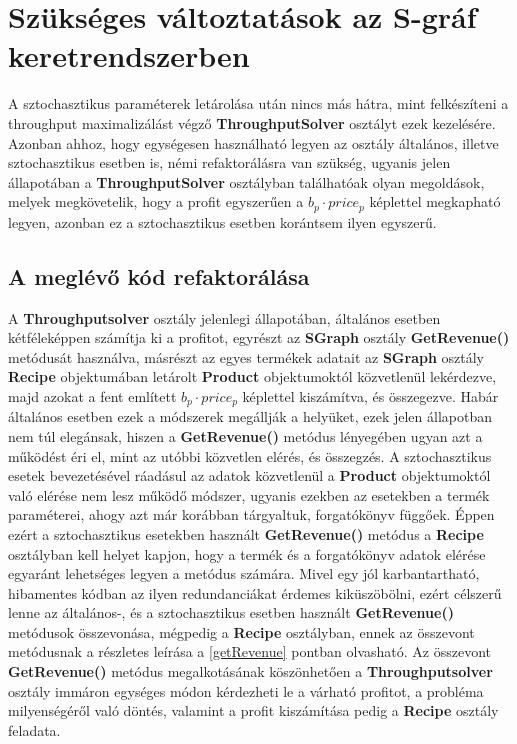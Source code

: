 \section{Szükséges változtatások az S-gráf keretrendszerben} \label{refactor}
A sztochasztikus paraméterek letárolása után nincs más hátra, mint felkészíteni a throughput maximalizálást végző \textbf{ThroughputSolver} osztályt ezek kezelésére. Azonban ahhoz, hogy egységesen használható legyen az osztály általános, illetve sztochasztikus esetben is, némi refaktorálásra van szükség, ugyanis jelen állapotában a \textbf{ThroughputSolver} osztályban találhatóak olyan megoldások, melyek megkövetelik, hogy a profit egyszerűen a $b_p\cdot price_p$ képlettel megkapható legyen, azonban ez a sztochasztikus esetben korántsem ilyen egyszerű.
\subsection{A meglévő kód refaktorálása}
A \textbf{Throughputsolver} osztály jelenlegi állapotában, általános esetben kétféleképpen számítja ki a profitot, egyrészt az \textbf{SGraph} osztály \textbf{GetRevenue()} metódusát használva, másrészt az egyes termékek adatait az \textbf{SGraph} osztály \textbf{Recipe} objektumában letárolt \textbf{Product} objektumoktól közvetlenül lekérdezve, majd azokat a fent említett $b_p\cdot price_p$ képlettel kiszámítva, és összegezve. Habár általános esetben ezek a módszerek megállják a helyüket, ezek jelen állapotban nem túl elegánsak, hiszen a \textbf{GetRevenue()} metódus lényegében ugyan azt a működést éri el, mint az utóbbi közvetlen elérés, és összegzés. A sztochasztikus esetek bevezetésével ráadásul az adatok közvetlenül a \textbf{Product} objektumoktól való elérése nem lesz működő módszer, ugyanis ezekben az esetekben a termék paraméterei, ahogy azt már korábban tárgyaltuk, forgatókönyv függőek. Éppen ezért a sztochasztikus esetekben használt \textbf{GetRevenue()} metódus a \textbf{Recipe} osztályban kell helyet kapjon, hogy a termék és a forgatókönyv adatok elérése egyaránt lehetséges legyen a metódus számára. Mivel egy jól karbantartható, hibamentes kódban az ilyen redundanciákat érdemes kiküszöbölni, ezért célszerű lenne az általános-, és a sztochasztikus esetben használt \textbf{GetRevenue()} metódusok összevonása, mégpedig a \textbf{Recipe} osztályban, ennek az összevont metódusnak a részletes leírása a \ref{getRevenue} pontban olvasható. Az összevont \textbf{GetRevenue()} metódus megalkotásának köszönhetően a \textbf{Throughputsolver} osztály immáron egységes módon kérdezheti le a várható profitot, a probléma milyenségéről való döntés, valamint a profit kiszámítása pedig a \textbf{Recipe} osztály feladata.
